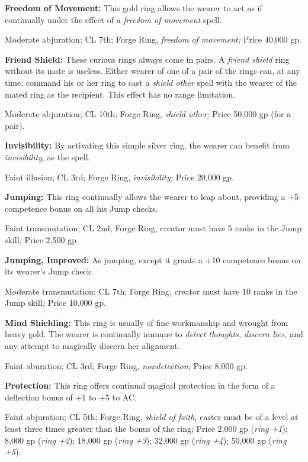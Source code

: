 \textbf{Freedom of Movement:} This gold ring allows the wearer to act as if continually 
under the effect of a \textit{freedom of movement }spell.

Moderate abjuration; CL 7th; Forge Ring, \textit{freedom of movement; }Price 40,000 
gp.

\textbf{Friend Shield:} These curious rings always come in pairs. A \textit{friend 
shield }ring without its mate is useless. Either wearer of one of a pair of the 
rings can, at any time, command his or her ring to cast a \textit{shield other 
}spell with the wearer of the mated ring as the recipient. This effect has no range 
limitation. 

Moderate abjuration; CL 10th; Forge Ring, \textit{shield other; }Price 50,000 gp 
(for a pair).

\textbf{Invisibility:} By activating this simple silver ring, the wearer can benefit 
from \textit{invisibility}, as the spell.

Faint illusion; CL 3rd; Forge Ring, \textit{invisibility; }Price 20,000 gp.

\textbf{Jumping:} This ring continually allows the wearer to leap about, providing 
a +5 competence bonus on all his Jump checks.

Faint transmutation; CL 2nd; Forge Ring, creator must have 5 ranks in the Jump 
skill\textit{; }Price 2,500 gp.

\textbf{Jumping, Improved:} As jumping, except it grants a +10 competence bonus 
on its wearer's Jump check.

Moderate transmutation; CL 7th; Forge Ring, creator must have 10 ranks in the Jump 
skill\textit{; }Price 10,000 gp.

\textbf{Mind Shielding:} This ring is usually of fine workmanship and wrought from 
heavy gold. The wearer is continually immune to \textit{detect thoughts, discern 
lies, }and any attempt to magically discern her alignment\textit{.}

Faint aburation; CL 3rd; Forge Ring, \textit{nondetection; }Price 8,000 gp.

\textbf{Protection:} This ring offers continual magical protection in the form 
of a deflection bonus of +1 to +5 to AC.

Faint abjuration; CL 5th; Forge Ring, \textit{shield of faith, }caster must be 
of a level at least three times greater than the bonus of the ring; Price 2,000 
gp (\textit{ring +1}); 8,000 gp (\textit{ring +2}); 18,000 gp (\textit{ring +3}); 
32,000 gp (\textit{ring +4}); 50,000 gp (\textit{ring +5}).

